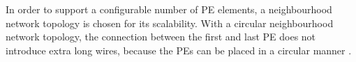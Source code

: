 In order to support a configurable number of PE elements, a neighbourhood network topology is chosen for its scalability. With a circular neighbourhood network topology, the connection between the first and last PE does not introduce extra long wires, because the PEs can be placed in a circular manner \cite{dongrio2}.



 

